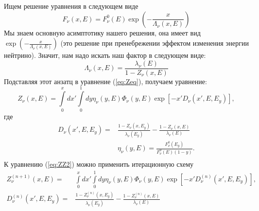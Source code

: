 Ищем решение уравнения в следующем виде 
\begin{equation}
    F_{\nu}(x,E) = F^{0}_{\nu}(E)\exp\left(-\frac{x}{\Lambda_{\nu}(x,E)}\right)
\end{equation}
Мы знаем основную асимптотику нашего решения, она имеет вид $\exp\left(-\frac{x}{\Lambda_{\nu}(x,E)}\right)$ (это решение при пренебрежении эффектом изменения энергии нейтрино). Значит, нам надо искать наш фактор в следующем виде:
\begin{equation}
    \Lambda_{\nu}(x,E) = \frac{\lambda_{\nu}(E)}{1 - Z_{\nu}(x,E)}
\end{equation}
Подставляя этот анзатц в уравнение (\ref{eq:Zeq}), получаем уравнение:
\begin{equation}
    Z_{\nu}(x,E) = \int\limits_0^xdx'\int\limits_0^1dy\eta_{\nu}(y,E)\Phi_{\nu}(y,E)\exp\left[ -x'D_{\nu}(x',E,E_y) \right],
\end{equation}
где
\begin{equation}
\label{eq:ZZ2}
\begin{aligned}
    D_{\nu}(x',E,E_y) = & \frac{1 - Z_{\nu}(x,E_y)}{\lambda_{\nu}(E_y)} - \frac{1 - Z_{\nu}(x,E)}{\lambda_{\nu}(E)}\\
    &\eta_{\nu}(y,E) = \frac{F^{0}_{\nu}(E_y)}{F^{0}_{\nu}(E)(1-y)}.\\
\end{aligned}
\end{equation}
К уравнению (\ref{eq:ZZ2}) можно применить итерационную схему
\begin{equation}
    \begin{aligned}
     Z^{(n+1)}_{\nu}(x,E) = &\int\limits_0^xdx'\int\limits_0^1dy\eta_{\nu}(y,E)\Phi_{\nu}(y,E)\exp\left[ -x'D^{(n)}_{\nu}(x',E,E_y) \right],\\
     D^{(n)}_{\nu}(x',E,E_y) =&\frac{1 - Z^{(n)}_{\nu}(x,E_y)}{\lambda_{\nu}(E_y)} - \frac{1 - Z^{(n)}_{\nu}(x,E)}{\lambda_{\nu}(E)}\\
   \end{aligned}
\end{equation}

